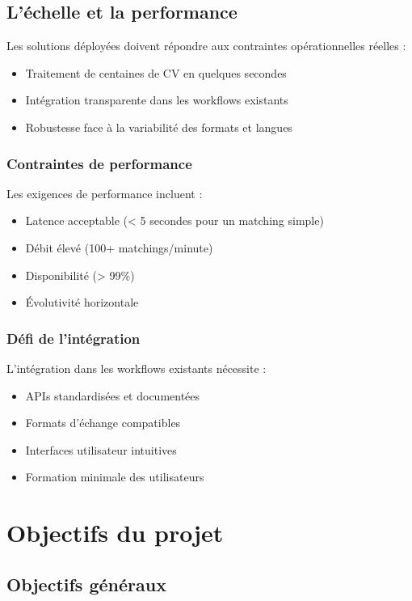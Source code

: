 \documentclass[12pt,a4paper]{report}
\begin{document}
\subsection{L'échelle et la performance}

Les solutions déployées doivent répondre aux contraintes opérationnelles réelles :
\begin{itemize}
\item Traitement de centaines de CV en quelques secondes
\item Intégration transparente dans les workflows existants
\item Robustesse face à la variabilité des formats et langues
\end{itemize}

\subsubsection{Contraintes de performance}

Les exigences de performance incluent :
\begin{itemize}
\item Latence acceptable (< 5 secondes pour un matching simple)
\item Débit élevé (100+ matchings/minute)
\item Disponibilité (> 99\%)
\item Évolutivité horizontale
\end{itemize}

\subsubsection{Défi de l'intégration}

L'intégration dans les workflows existants nécessite :
\begin{itemize}
\item APIs standardisées et documentées
\item Formats d'échange compatibles
\item Interfaces utilisateur intuitives
\item Formation minimale des utilisateurs
\end{itemize}

\section{Objectifs du projet}

\subsection{Objectifs généraux}
\end{document}
